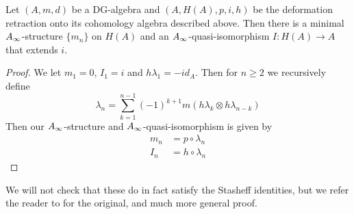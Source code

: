 \begin{theorem}
Let $(A, m, d)$ be a DG-algebra and $(A, H(A), p, i, h)$ be the deformation retraction onto its cohomology algebra described above. Then there is a minimal $A_{\infty}$-structure $\{m_n\}$ on $H(A)$ and an $A_{\infty}$-quasi-isomorphism $I\colon H(A)\longrightarrow A$ that extends $i$. 
\end{theorem}
\begin{proof}
We let $m_1=0$, $I_1=i$ and $h\lambda_1 = -id_A$. Then for $n\geq 2$ we recursively define
\begin{equation*}
    \lambda_n = \sum_{k=1}^{n-1}(-1)^{k+1}m(h\lambda_k\otimes h\lambda_{n-k})
\end{equation*}
Then our $A_{\infty}$-structure and $A_{\infty}$-quasi-isomorphism is given by 
\begin{align*}
    m_n &= p\circ \lambda_n \\
    I_n &= h\circ \lambda_n
\end{align*}
\end{proof}

We will not check that these do in fact satisfy the Stasheff identities, but we refer the reader to \cite{kadeishvili} for the original, and much more general proof. 




